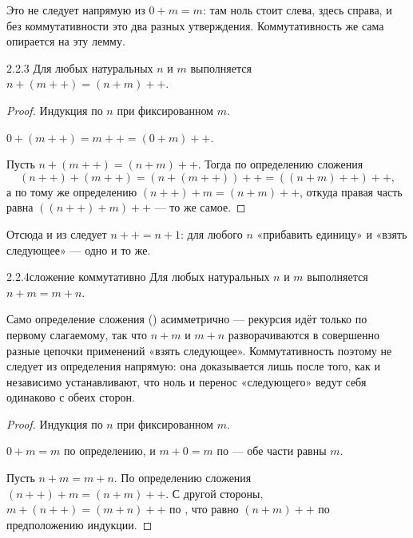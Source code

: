 \begin{remark}
Это не следует напрямую из $0+m=m$: там ноль стоит слева, здесь справа, и без
коммутативности это два разных утверждения. Коммутативность же сама опирается на эту
лемму.
\end{remark}

\begin{lemma}{2.2.3}{}
Для любых натуральных $n$ и $m$ выполняется $n+(m{+}{+})=(n+m){+}{+}$.
\end{lemma}

\begin{proof}
Индукция по $n$ при фиксированном $m$.

 $0+(m{+}{+})=m{+}{+}=(0+m){+}{+}$.

 Пусть $n+(m{+}{+})=(n+m){+}{+}$. Тогда по определению сложения
\[
  (n{+}{+})+(m{+}{+}) = (n+(m{+}{+})){+}{+} = ((n+m){+}{+}){+}{+},
\]
а по тому же определению $(n{+}{+})+m=(n+m){+}{+}$, откуда правая часть равна
$((n{+}{+})+m){+}{+}$ — то же самое.
\end{proof}

\begin{remark}
Отсюда и из  следует $n{+}{+}=n+1$: для любого $n$ «прибавить
единицу» и «взять следующее» — одно и то же.
\end{remark}

\begin{proposition}{2.2.4}{сложение коммутативно}
Для любых натуральных $n$ и $m$ выполняется $n+m=m+n$.
\end{proposition}

\begin{intuition}
Само определение сложения () асимметрично — рекурсия
идёт только по первому слагаемому, так что $n+m$ и $m+n$ разворачиваются в совершенно разные
цепочки применений «взять следующее». Коммутативность поэтому не следует из определения
напрямую: она доказывается лишь после того, как  и
 независимо устанавливают, что ноль и перенос «следующего»
ведут себя одинаково с обеих сторон.
\end{intuition}

\begin{proof}
Индукция по $n$ при фиксированном $m$.

 $0+m=m$ по определению, и $m+0=m$ по  —
обе части равны $m$.

 Пусть $n+m=m+n$. По определению сложения $(n{+}{+})+m=(n+m){+}{+}$.
С другой стороны, $m+(n{+}{+})=(m+n){+}{+}$ по , что равно
$(n+m){+}{+}$ по предположению индукции.
\end{proof}

